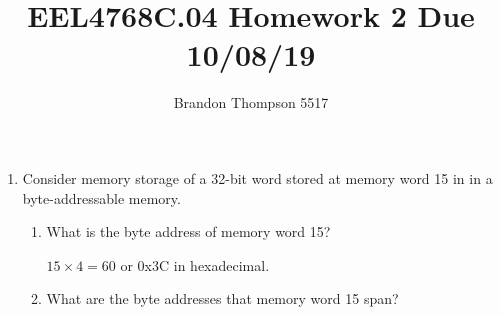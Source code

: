 \documentclass[a4paper]{article}
\begin{document}
	\title{EEL4768C.04 Homework 2 Due 10/08/19}
	\author{Brandon Thompson 5517}
	\maketitle

	\begin{enumerate}
		\item Consider memory storage of a 32-bit word stored at memory word 15
			in in a byte-addressable memory.
			\begin{enumerate}
				\item What is the byte address of memory word 15?
					
					$15 \times 4 = 60$ or 0x3C in hexadecimal.
				\item What are the byte addresses that memory word 15 span?
					

\end{enumerate}
\end{enumerate}
\end{document}
